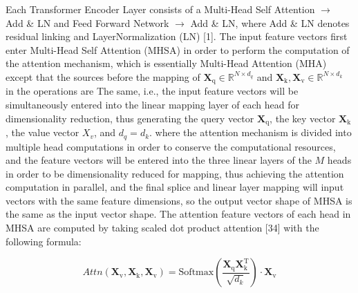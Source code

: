 Each Transformer Encoder Layer consists of a Multi-Head Self Attention $\to$ Add \& LN and Feed Forward Network $\to$ Add \& LN, where Add \& LN denotes residual linking and LayerNormalization (LN) [1]. The input feature vectors first enter Multi-Head Self Attention (MHSA) in order to perform the computation of the attention mechanism, which is essentially Multi-Head Attention (MHA) except that the sources before the mapping of $\boldsymbol{X}_\text{q} \in \mathbb{R}^{N\times d_q}$ and $\boldsymbol{X}_\text{k}, \boldsymbol{X}_\text{v} \in \mathbb{R}^{N\times d_k }$ in the operations are The same, i.e., the input feature vectors will be simultaneously entered into the linear mapping layer of each head for dimensionality reduction, thus generating the query vector $\boldsymbol{X}_\text{q}$, the key vector $\boldsymbol{X}_\text{k}$, the value vector $X_v$, and $d_q = d_k$. where the attention mechanism is divided into multiple head computations in order to conserve the computational resources, and the feature vectors will be entered into the three linear layers of the $M$ heads in order to be dimensionality reduced for mapping, thus achieving the attention computation in parallel, and the final splice and linear layer mapping will input vectors with the same feature dimensions, so the output vector shape of MHSA is the same as the input vector shape. The attention feature vectors of each head in MHSA are computed by taking scaled dot product attention [34] with the following formula:

\begin{equation}
\label{eq6}
  Attn(\boldsymbol{X}_\text{v}, \boldsymbol{X}_\text{k}, \boldsymbol{X}_\text{v}) = \text{Softmax} \left( \frac{\boldsymbol{X}_\text{q}\boldsymbol{X}_\text{k}^\mathrm{T}}{\sqrt{d_k}} \right)\cdot \boldsymbol{X}_\text{v}
\end{equation}


